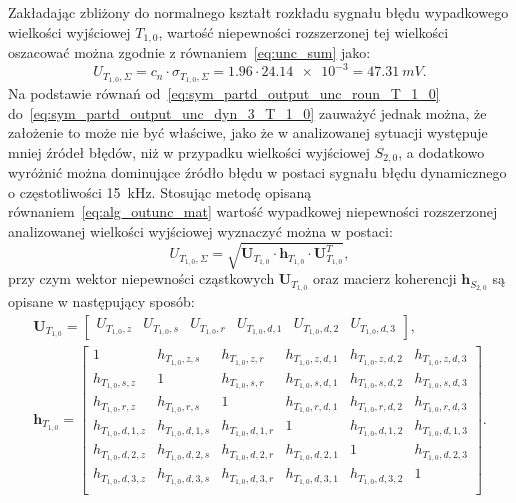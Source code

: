 Zakładając zbliżony do normalnego kształt rozkładu sygnału błędu wypadkowego wielkości wyjściowej $T_{1,0}$, wartość niepewności rozszerzonej tej wielkości oszacować można zgodnie z równaniem~\eqref{eq:unc_sum} jako:
\begin{equation}
U_{T_{1,0},\Sigma} = c_{n} \cdot \sigma_{T_{1,0},\Sigma} = 1.96 \cdot \num{24.14e-3} = \qty{47.31}{mV} \label{eq:sym_partd_output_unc_total_a_T_1_0}.
\end{equation}
Na podstawie równań od~\eqref{eq:sym_partd_output_unc_roun_T_1_0} do~\eqref{eq:sym_partd_output_unc_dyn_3_T_1_0} zauważyć jednak można, że założenie to może nie być właściwe, jako że w analizowanej sytuacji występuje mniej źródeł błędów, niż w przypadku wielkości wyjściowej $S_{2,0}$, a dodatkowo wyróżnić można dominujące źródło błędu w postaci sygnału błędu dynamicznego o częstotliwości \qty{15}{kHz}.
Stosując metodę opisaną równaniem~\eqref{eq:alg_outunc_mat} wartość wypadkowej niepewności rozszerzonej analizowanej wielkości wyjściowej wyznaczyć można w postaci:
\begin{equation}
U_{T_{1,0},\Sigma} = \sqrt{\mathbf{U}_{T_{1,0}} \cdot \mathbf{h}_{T_{1,0}} \cdot \mathbf{U}_{T_{1,0}}^{T}} \label{eq:sym_partd_output_unc_summul_T_1_0},
\end{equation}
przy czym wektor niepewności cząstkowych $\mathbf{U}_{T_{1,0}}$ oraz macierz koherencji $\mathbf{h}_{S_{2,0}}$ są opisane w następujący sposób:
\begin{gather}
\mathbf{U}_{T_{1,0}} =
\begin{bmatrix}
U_{T_{1,0},z} & U_{T_{1,0},s} & U_{T_{1,0},r} & U_{T_{1,0},d,1} & U_{T_{1,0},d,2} & U_{T_{1,0},d,3}
\end{bmatrix}
\label{eq:sym_partd_output_unc_sumuvect_T_1_0}, \\
\mathbf{h}_{T_{1,0}} =
\begin{bmatrix}
1                 & h_{T_{1,0},z,s}   & h_{T_{1,0},z,r}   & h_{T_{1,0},z,d,1} & h_{T_{1,0},z,d,2} & h_{T_{1,0},z,d,3} \\
h_{T_{1,0},s,z}   & 1                 & h_{T_{1,0},s,r}   & h_{T_{1,0},s,d,1} & h_{T_{1,0},s,d,2} & h_{T_{1,0},s,d,3} \\
h_{T_{1,0},r,z}   & h_{T_{1,0},r,s}   & 1                 & h_{T_{1,0},r,d,1} & h_{T_{1,0},r,d,2} & h_{T_{1,0},r,d,3} \\
h_{T_{1,0},d,1,z} & h_{T_{1,0},d,1,s} & h_{T_{1,0},d,1,r} & 1                 & h_{T_{1,0},d,1,2} & h_{T_{1,0},d,1,3} \\
h_{T_{1,0},d,2,z} & h_{T_{1,0},d,2,s} & h_{T_{1,0},d,2,r} & h_{T_{1,0},d,2,1} & 1                 & h_{T_{1,0},d,2,3} \\
h_{T_{1,0},d,3,z} & h_{T_{1,0},d,3,s} & h_{T_{1,0},d,3,r} & h_{T_{1,0},d,3,1} & h_{T_{1,0},d,3,2} & 1                 \\
\end{bmatrix}
\label{eq:sym_partd_output_unc_sumcoher_T_1_0}.
\end{gather}
